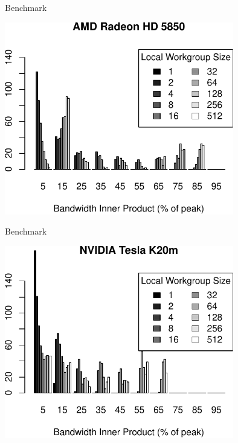\begin{frame}{Benchmark}
  \begin{center} \includegraphics[width=0.75\textwidth]{figures/hd5850_double_hist_local-ws_dot} \end{center}
\end{frame}

\begin{frame}{Benchmark}
  \begin{center} \includegraphics[width=0.75\textwidth]{figures/k20m_double_hist_local-ws_dot} \end{center}
\end{frame}



